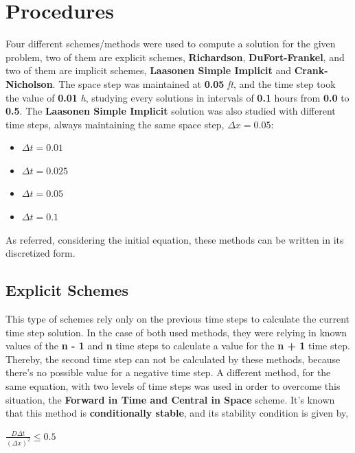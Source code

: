 \documentclass[12pt]{article}
\begin{document}
\section*{Procedures}
Four different schemes/methods were used to compute a solution for the given problem, two of them are explicit schemes, \textbf{Richardson}, \textbf{DuFort-Frankel}, and two of them are implicit schemes, \textbf{Laasonen Simple Implicit} and \textbf{Crank-Nicholson}. The space step was maintained at \textbf{0.05} \textit{ft}, and the time step took the value of \textbf{0.01} \textit{h}, studying every solutions in intervals of \textbf{0.1} hours from \textbf{0.0} to \textbf{0.5}. The \textbf{Laasonen Simple Implicit} solution was also studied with different time steps, always maintaining the same space step,  \textbf{$\Delta x = 0.05$}:
\begin{itemize}[noitemsep] 
\item $ \Delta t = 0.01 $
\item $ \Delta t = 0.025 $
\item $ \Delta t = 0.05 $
\item $ \Delta t = 0.1 $
\end{itemize}
As referred, considering the initial equation, these methods can be written in its discretized form.

\subsection*{Explicit Schemes}

\par This type of schemes rely only on the previous time steps to calculate the current time step solution. In the case of both used methods, they were relying in known values of the \textbf{n - 1} and \textbf{n} time steps to calculate a value for the \textbf{n + 1} time step. Thereby, the second time step can not be calculated by these methods, because there's no possible value for a negative time step. A different method, for the same equation, with two levels of time steps was used in order to overcome this situation, the \textbf{Forward in Time and Central in Space} scheme. It's known that this method is \textbf{conditionally stable}, and its stability condition is given by\cite{hoffman},

\begin{center}
\Large
$
\frac{D \Delta t}{(\Delta x)^2} \leq 0.5
$
\end{center}
\end{document}

